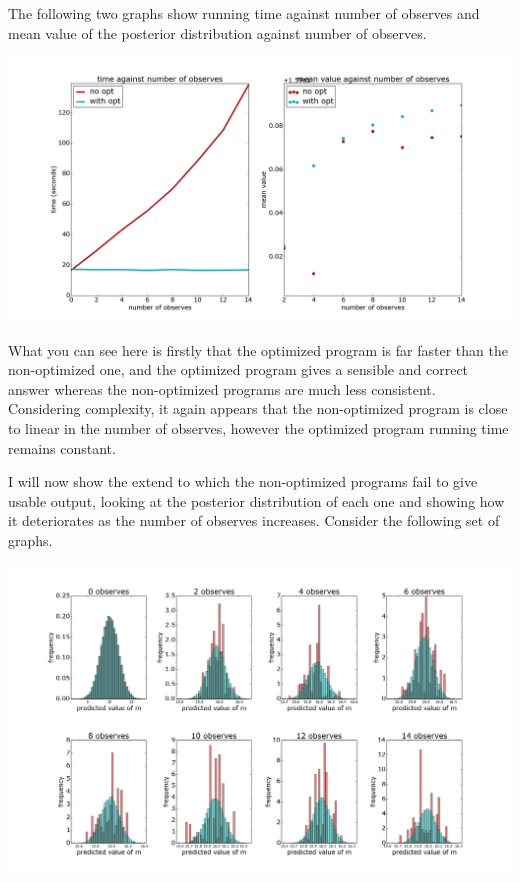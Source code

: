 \documentclass[a4paper]{article}
\begin{document}
The following two graphs show running time against number of observes and mean value of the posterior distribution against number of observes.

\centerline{\includegraphics[width=16cm]{images/removing_observes_1.png}}

What you can see here is firstly that the optimized program is far faster than the non-optimized one, and the optimized program gives a sensible and correct answer whereas the non-optimized programs are much less consistent. Considering complexity, it again appears that the non-optimized program is close to linear in the number of observes, however the optimized program running time remains constant.

I will now show the extend to which the non-optimized programs fail to give usable output, looking at the posterior distribution of each one and showing how it deteriorates as the number of observes increases. Consider the following set of graphs.

\centerline{\includegraphics[width=16cm]{images/removing_observes_2.png}}
\end{document}
